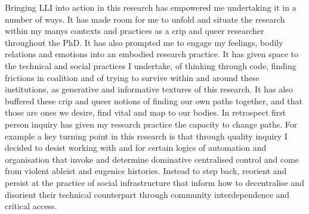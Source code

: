 Bringing LLI into action in this research has empowered me undertaking
it in a number of ways. It has made room for me to unfold and situate
the research within my manys contexts and practices as a crip and queer
researcher throughout the PhD. It has also prompted me to engage my
feelings, bodily relations and emotions into an embodied research
practice. It has given space to the technical and social practices I
undertake, of thinking through code, finding frictions in coalition and
of trying to survive within and around these institutions, as generative
and informative textures of this research. It has also buffered these
crip and queer notions of finding our own paths together, and that those
are ones we desire, find vital and map to our bodies. In retrospect
first person inquiry has given my research practice the capacity to
change paths. For example a key turning point in this research is that
through quality inquiry I decided to desist working with and for certain
logics of automation and organisation that invoke and determine
dominative centralised control and come from violent ableist and
eugenics histories. Instead to step back, reorient and persist at the
practice of social infrastructure that inform how to decentralise and
disorient their technical counterpart through community interdependence
and critical access.


